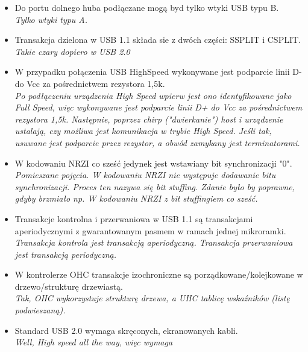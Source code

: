 \begin{itemize}
	\item \textcolor{nie}{Do portu dolnego huba podłączane mogą byd tylko wtyki USB typu B.} \\
	{\small \emph{Tylko wtyki typu A.}}
	
	\item \textcolor{nie}{Transakcja dzielona w USB 1.1 składa sie z dwóch części: SSPLIT i CSPLIT.} \\
	{\small \emph{Takie czary dopiero w USB 2.0}}
	
	\item \textcolor{nie}{W przypadku połączenia USB HighSpeed wykonywane jest podparcie linii D- do Vcc za pośrednictwem rezystora 1,5k.} \\
	{\small \emph{Po podłączeniu urządzenia High Speed wpierw jest ono identyfikowane jako Full Speed, więc wykonywane jest podparcie linii D+ do Vcc za pośrednictwem rezystora 1,5k. Następnie, poprzez chirp ("dwierkanie") host i urządzenie ustalają, czy możliwa jest komunikacja w trybie High Speed. Jeśli tak, usuwane jest podparcie przez rezystor, a obwód zamykany jest terminatorami.}}
	
	\item \textcolor{nie}{W kodowaniu NRZI co sześć jedynek jest wstawiany bit synchronizacji "0".} \\
	{\small \emph{Pomieszane pojęcia. W kodowaniu NRZI nie występuje dodawanie bitu synchronizacji. Proces ten nazywa się bit stuffing. Zdanie było by poprawne, gdyby brzmiało np. W kodowaniu NRZI z bit stuffingiem co sześć.}}
	
	\item \textcolor{nie}{Transakcje kontrolna i przerwaniowa w USB 1.1 są transakcjami aperiodycznymi z gwarantowanym pasmem w ramach jednej mikroramki.} \\
	{\small \emph{Transakcja kontrola jest transakcją aperiodyczną. Transakcja przerwaniowa jest transakcją periodyczną.}}
	
	\item \textcolor{tak}{W kontrolerze OHC transakcje izochroniczne są porządkowane/kolejkowane w drzewo/strukturę drzewiastą.} \\
	{\small \emph{Tak, OHC wykorzystuje strukturę drzewa, a UHC tablicę wskaźników (listę podwieszaną).}}
	
	\item \textcolor{tak}{Standard USB 2.0 wymaga skręconych, ekranowanych kabli.} \\
	{\small \emph{Well, High speed all the way, więc wymaga}}
	

\end{itemize}
